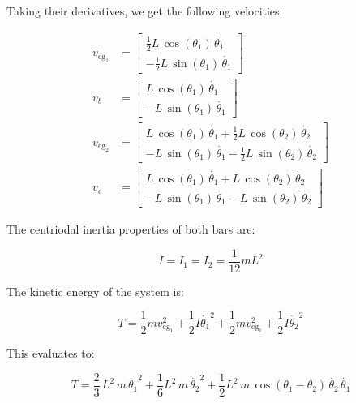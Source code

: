 \documentclass[12pt, letterpaper]{../assignment}
\begin{document}
Taking their derivatives, we get the following velocities:

\begin{equation*}
    \begin{aligned}
        v_{\text{cg}_1} &= \left[\begin{array}{c}
            \frac{1}{2}L\,\cos \left(\theta_1 \right)\,\dot{\theta_1}\\
            -\frac{1}{2}L\,\sin \left(\theta_1 \right)\,\dot{\theta_1}
            \end{array}\right]\\
        v_b &= \left[\begin{array}{c}
            L\,\cos \left(\theta_1 \right)\,\dot{\theta_1} \\
            -L\,\sin \left(\theta_1 \right)\,\dot{\theta_1} 
            \end{array}\right] \\
        v_{\text{cg}_2} &= \left[\begin{array}{c}
            L\,\cos \left(\theta_1 \right)\,\dot{\theta_1} +\frac{1}{2}L\,\cos \left(\theta_2 \right)\,\dot{\theta_2}\\
            -L\,\sin \left(\theta_1 \right)\,\dot{\theta_1} -\frac{1}{2}L\,\sin \left(\theta_2 \right)\,\dot{\theta_2}
            \end{array}\right]\\
        v_c &= \left[\begin{array}{c}
            L\,\cos \left(\theta_1 \right)\,\dot{\theta_1} +L\,\cos \left(\theta_2 \right)\,\dot{\theta_2} \\
            -L\,\sin \left(\theta_1 \right)\,\dot{\theta_1} -L\,\sin \left(\theta_2 \right)\,\dot{\theta_2} 
            \end{array}\right]
    \end{aligned}
\end{equation*}

The centriodal inertia properties of both bars are:

$$ I = I_1  = I_2 = \frac{1}{12} m L^2 $$

The kinetic energy of the system is:

$$ T =  \frac{1}{2} m v_{\text{cg}_1}^2 +
    \frac{1}{2}I \dot{\theta_1}^2 +
    \frac{1}{2} m v_{\text{cg}_1}^2 +
    \frac{1}{2} I \dot{\theta_2}^2 $$

This evaluates to:

$$ T = \frac{2}{3}\,L^2 \,m\,{{\dot{\theta_1}}}^2+
\frac{1}{6}L^2 \,m\,{{\dot{\theta_2}}}^2+
\frac{1}{2}L^2 \,m\,\cos \left(\theta_1 -\theta_2 \right)\,\dot{\theta_2} \,\dot{\theta_1}  $$
\end{document}
